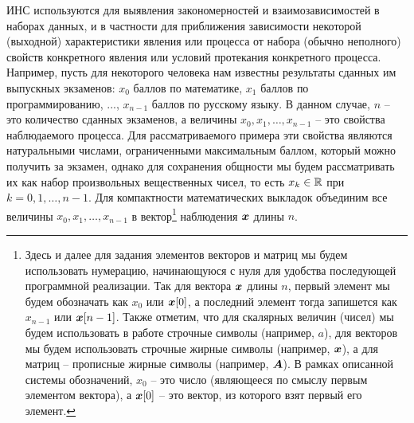 \documentclass[a4paper,12pt,russian]{article} %
\begin{document}
ИНС используются для выявления закономерностей и взаимозависимостей в наборах данных, и в частности для приближения зависимости некоторой (выходной) характеристики явления или процесса от набора (обычно неполного) свойств конкретного явления или условий протекания конкретного процесса.
Например, пусть для некоторого человека нам известны результаты сданных им выпускных экзаменов: $x_0$ баллов по математике, $x_1$ баллов по программированию, ..., $x_{n-1}$ баллов по русскому языку.
В данном случае, $n$ -- это количество сданных экзаменов, а величины $x_0, x_1, \ldots, x_{n-1}$ -- это свойства наблюдаемого процесса. Для рассматриваемого примера эти свойства являются натуральными числами, ограниченными максимальным баллом, который можно получить за экзамен, однако для сохранения общности мы будем рассматривать их как набор произвольных вещественных чисел, то есть $x_{k} \in \mathbb{R}$ при $k=0, 1, \ldots, n-1$.
Для компактности математических выкладок объединим все величины $x_0, x_1, \ldots, x_{n-1}$ в вектор\footnote{
	Здесь и далее для задания элементов векторов и матриц мы будем использовать нумерацию, начинающуюся с нуля для удобства последующей  программной реализации.
	Так для вектора $\bm{x}$ длины $n$, первый элемент мы будем обозначать как $x_0$ или $\bm{x}[0]$, а последний элемент тогда запишется как $x_{n-1}$ или $\bm{x}[n-1]$.
	Также отметим, что для скалярных величин (чисел) мы будем использовать в работе строчные символы (например, $a$), для векторов мы будем использовать строчные жирные символы (например, $\bm{x}$), а для матриц -- прописные жирные символы (например, $\bm{A}$).
	В рамках описанной системы обозначений, $x_0$ -- это число (являющееся по смыслу первым элементом вектора), а $\bm{x}[0]$ -- это вектор, из которого взят первый его элемент. 
}
наблюдения $\bm{x}$ длины $n$.
\end{document}
